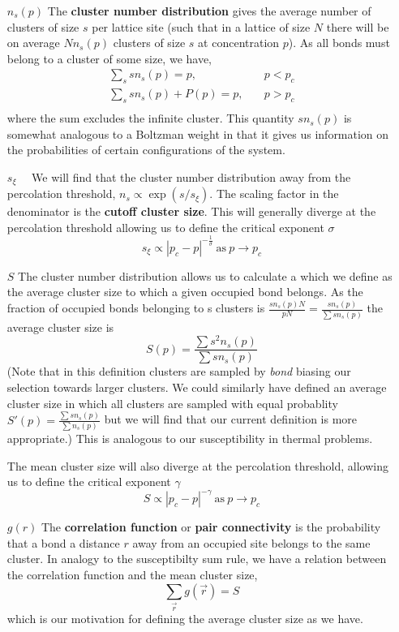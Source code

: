 \begin{enumerate}
\item[$n_s(p)$] The \textbf{cluster number distribution} gives the average number of
clusters of size $s$ per lattice site (such that in a lattice of size $N$ there will be on
average $Nn_s(p)$ clusters of size $s$ at concentration $p$).  As all bonds must belong
to a cluster of some size, we have,
\begin{align*}
\sum_s sn_s(p) = p,&\quad p<p_c \\
\sum_s sn_s(p)+ P(p) = p,&\quad p>p_c \\
\end{align*}
 where the sum excludes the infinite cluster. This
quantity $sn_s(p)$ is somewhat
analogous to a Boltzman weight in that it gives us information on the probabilities of
certain configurations of the system.

\item[$s_\xi\quad$] We will find that the cluster number
distribution away from the percolation threshold, $n_s \propto \exp{(s/s_\xi)}$.
The scaling factor in the denominator is the \textbf{cutoff cluster size}.  This will
generally diverge at the percolation threshold allowing us to define the critical exponent
$\sigma$
\[ s_\xi \propto |p_c - p|^{-\frac{1}{\sigma}} \ \text{as}\ p\to p_c \]

\item[$S$\quad] The cluster number distribution allows us to calculate a  which we define as the average cluster size to which a given occupied bond belongs.
As the fraction of occupied bonds belonging to s clusters is
\(\frac{sn_s(p)N}{pN} = \frac{sn_s(p)}{\sum sn_s(p)}\) the average cluster size is
\[S(p) = \frac{\sum s^2 n_s(p)}{\sum s n_s(p)}\]
(Note that in this definition clusters are sampled by \emph{bond} biasing our selection
towards larger clusters.  We could similarly have defined an average cluster size in which
all clusters are sampled with equal probablity
\(S'(p) = \frac{\sum s n_s(p)}{\sum  n_s(p)}\) but we will find that our current definition
is more appropriate.) This is analogous to our susceptibility in thermal problems.

The mean cluster size will also diverge at the percolation threshold, allowing us to
define the critical exponent $\gamma$
\[ S \propto |p_c - p|^{-\gamma} \ \text{as}\ p\to p_c \]

\item[$g(r)$] The \textbf{correlation function} or \textbf{pair connectivity} is the
probability that a bond a distance $r$ away from an occupied site belongs to the same
cluster.  In analogy to the susceptibilty sum rule, we have a relation between the
correlation function and the mean cluster size,
\[\sum_{\vec{r}} g(\vec{r}) = S\]
which is our motivation for defining the average cluster size as we have.


\end{enumerate}
